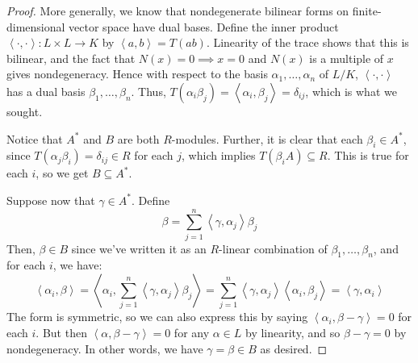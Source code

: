 \begin{proof}
	More generally, we know that nondegenerate bilinear forms on finite-dimensional vector space have dual bases. Define the inner product $\left<\cdot,\cdot\right> : L \times L \to K$ by $\left<a,b\right> = T(ab)$. Linearity of the trace shows that this is bilinear, and the fact that $N(x) = 0 \implies x = 0$ and $N(x)$ is a multiple of $x$ gives nondegeneracy. Hence with respect to the basis $\alpha_1,\ldots,\alpha_n$ of $L/K$, $\left<\cdot,\cdot\right>$ has a dual basis $\beta_1,\ldots,\beta_n$. Thus, $T(\alpha_i\beta_j) = \left<\alpha_i,\beta_j\right> = \delta_{ij}$, which is what we sought.
	
	Notice that $A^\ast$ and $B$ are both $R$-modules. Further, it is clear that each $\beta_i \in A^\ast$, since $T(\alpha_j\beta_i) = \delta_{ij} \in R$ for each $j$, which implies $T(\beta_iA) \subseteq R$. This is true for each $i$, so we get $B \subseteq A^\ast$.
	
	Suppose now that $\gamma \in A^\ast$. Define
	\[ \beta = \sum_{j=1}^n \left<\gamma,\alpha_j\right>\beta_j \]
	Then, $\beta \in B$ since we've written it as an $R$-linear combination of $\beta_1,\ldots,\beta_n$, and for each $i$, we have:
	\[ \left<\alpha_i,\beta\right> = \left<\alpha_i,\sum_{j=1}^n \left<\gamma,\alpha_j\right>\beta_j\right> = \sum_{j=1}^n \left<\gamma,\alpha_j\right>\left<\alpha_i,\beta_j\right> = \left<\gamma,\alpha_i\right> \]
	The form is symmetric, so we can also express this by saying $\left<\alpha_i,\beta-\gamma\right> = 0$ for each $i$. But then $\left<\alpha,\beta-\gamma\right> = 0$ for any $\alpha \in L$ by linearity, and so $\beta-\gamma = 0$ by nondegeneracy. In other words, we have $\gamma = \beta \in B$ as desired.
\end{proof}
